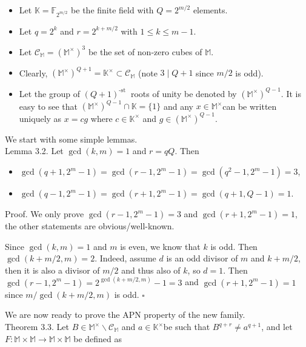 \documentclass[10pt]{article}
\begin{document}
\begin{itemize}
  \item Let $\mathbb{K}=\mathbb{F}_{2^{m / 2}}$ be the finite field with $Q=2^{m / 2}$ elements.
  \item Let $q=2^{k}$ and $r=2^{k+m / 2}$ with $1 \leqslant k \leqslant m-1$.
  \item Let $\mathcal{C}_{\mathbb{M}}=\left(\mathbb{M}^{\times}\right)^{3}$ be the set of non-zero cubes of $\mathbb{M}$.
  \item Clearly, $\left(\mathbb{M}^{\times}\right)^{Q+1}=\mathbb{K}^{\times} \subset \mathcal{C}_{\mathbb{M}}$ (note $3 \mid Q+1$ since $m / 2$ is odd).
  \item Let the group of $(Q+1)^{\text {-st }}$ roots of unity be denoted by $\left(\mathbb{M}^{\times}\right)^{Q-1}$. It is easy to see that $\left(\mathbb{M}^{\times}\right)^{Q-1} \cap \mathbb{K}=\{1\}$ and any $x \in \mathbb{M}^{\times}$can be written uniquely as $x=c g$ where $c \in \mathbb{K}^{\times}$ and $g \in\left(\mathbb{M}^{\times}\right)^{Q-1}$.
\end{itemize}

We start with some simple lemmas.\\
Lemma 3.2. Let $\operatorname{gcd}(k, m)=1$ and $r=q Q$. Then

\begin{itemize}
  \item $\operatorname{gcd}\left(q+1,2^{m}-1\right)=\operatorname{gcd}\left(r-1,2^{m}-1\right)=\operatorname{gcd}\left(q^{2}-1,2^{m}-1\right)=3$,
  \item $\operatorname{gcd}\left(q-1,2^{m}-1\right)=\operatorname{gcd}\left(r+1,2^{m}-1\right)=\operatorname{gcd}(q+1, Q-1)=1$.
\end{itemize}

Proof. We only prove $\operatorname{gcd}\left(r-1,2^{m}-1\right)=3$ and $\operatorname{gcd}\left(r+1,2^{m}-1\right)=1$, the other statements are obvious/well-known.

Since $\operatorname{gcd}(k, m)=1$ and $m$ is even, we know that $k$ is odd. Then $\operatorname{gcd}(k+m / 2, m)=2$. Indeed, assume $d$ is an odd divisor of $m$ and $k+m / 2$, then it is also a divisor of $m / 2$ and thus also of $k$, so $d=1$. Then $\operatorname{gcd}\left(r-1,2^{m}-1\right)=2^{\operatorname{gcd}(k+m / 2, m)}-1=3$ and $\operatorname{gcd}\left(r+1,2^{m}-1\right)=1$ since $m / \operatorname{gcd}(k+m / 2, m)$ is odd. \(\square\)

We are now ready to prove the APN property of the new family.\\
Theorem 3.3. Let $B \in \mathbb{M}^{\times} \backslash \mathcal{C}_{\mathbb{M}}$ and $a \in \mathbb{K}^{\times}$be such that $B^{q+r} \neq a^{q+1}$, and let $F: \mathbb{M} \times \mathbb{M} \rightarrow \mathbb{M} \times \mathbb{M}$ be defined as
\end{document}
